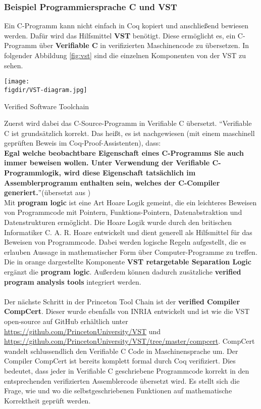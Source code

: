 \subsubsection{Beispiel Programmiersprache C und VST}
Ein C-Programm kann nicht einfach in Coq kopiert und anschließend bewiesen werden. Dafür wird das Hilfsmittel \textbf{VST} benötigt. Diese ermöglicht es, ein C-Programm über \textbf{Verifiable C} in verifizierten Maschinencode zu übersetzen.
In folgender Abbildung \ref{fig:vst} sind die einzelnen Komponenten von der VST zu sehen.

\begin{minipage}{\textwidth}
	\centering
	\captionsetup{type=figure}
	\texttt{[image: \\figdir/VST-diagram.jpg]}
	\caption{Verified Software Toolchain\cite{PRINCETON01:VST}}
	\label{fig:vst}
\end{minipage}

Zuerst wird dabei das C-Source-Programm in Verifiable C übersetzt.
"`Verifiable C ist grundsätzlich korrekt. Das heißt, es ist nachgewiesen (mit einem maschinell geprüften Beweis im Coq-Proof-Assistenten), dass:\\
\textbf{Egal welche beobachtbare Eigenschaft eines C-Programms Sie auch immer beweisen wollen. Unter Verwendung der Verifiable C-Programmlogik, wird diese Eigenschaft
tatsächlich im Assemblerprogramm enthalten sein, welches der C-Compiler generiert.}"'(übersetzt aus \cite{Appel02:VST})\\
Mit \textbf{program logic} ist eine Art Hoare Logik gemeint, die ein leichteres Beweisen von Programmcode mit Pointern, Funktions-Pointern, Datenabstraktion und Datenstrukturen ermöglicht.\cite{Appel02:VST} Die Hoare Logik wurde durch den britischen Informatiker C. A. R. Hoare entwickelt und dient generell als Hilfsmittel für das Beweisen von Programmcode. Dabei werden logische Regeln aufgestellt, die es erlauben Aussage in mathematischer Form über Computer-Programme zu treffen.\\
Die in orange dargestellte Komponente \textbf{VST retargetable Separation Logic} ergänzt die \textbf{program logic}. Außerdem können dadurch zusätzliche \textbf{verified program analysis tools} integriert werden.\\
\\
Der nächste Schritt in der Princeton Tool Chain ist der \textbf{verified Compiler CompCert}. Dieser wurde ebenfalls von INRIA entwickelt und ist wie die VST open-source auf GitHub erhältlich unter \url{https://github.com/PrincetonUniversity/VST} und \url{https://github.com/PrincetonUniversity/VST/tree/master/compcert}. 
CompCert wandelt schlussendlich den Verifiable C Code in Maschinensprache um.
Der Compiler CompCert ist bereits komplett formal durch Coq verifiziert. Dies bedeutet, dass jeder in Verifiable C geschriebene Programmcode korrekt in den entsprechenden verifizierten Assemblercode übersetzt wird. Es stellt sich die Frage, wie und wo die selbstgeschriebenen Funktionen auf mathematische Korrektheit geprüft werden.

